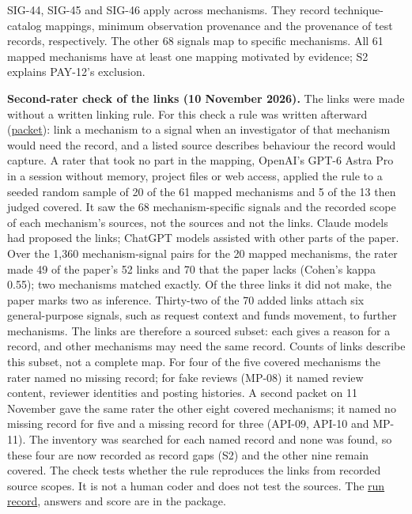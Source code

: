 \documentclass[
  11pt,
]{article}
\begin{document}
\mbox{SIG-44}, \mbox{SIG-45} and \mbox{SIG-46} apply across mechanisms.
They record technique-catalog mappings, minimum observation provenance
and the provenance of test records, respectively. The other 68 signals
map to specific mechanisms. All 61 mapped mechanisms have at least one
mapping motivated by evidence; S2 explains \mbox{PAY-12}'s exclusion.

\textbf{Second-rater check of the links (10 November 2026).} The links
were made without a written linking rule. For this check a rule was
written afterward (\href{tools/second_coder/PACKET.md}{packet}): link a
mechanism to a signal when an investigator of that mechanism would need
the record, and a listed source describes behaviour the record would
capture. A rater that took no part in the mapping, OpenAI's \mbox{GPT-6}
Astra Pro in a session without memory, project files or web access,
applied the rule to a seeded random sample of 20 of the 61 mapped
mechanisms and 5 of the 13 then judged covered. It saw the 68
mechanism-specific signals and the recorded scope of each mechanism's
sources, not the sources and not the links. Claude models had proposed
the links; ChatGPT models assisted with other parts of the paper. Over
the 1,360 mechanism-signal pairs for the 20 mapped mechanisms, the rater
made 49 of the paper's 52 links and 70 that the paper lacks (Cohen's
kappa 0.55); two mechanisms matched exactly. Of the three links it did
not make, the paper marks two as inference. Thirty-two of the 70 added
links attach six general-purpose signals, such as request context and
funds movement, to further mechanisms. The links are therefore a sourced
subset: each gives a reason for a record, and other mechanisms may need
the same record. Counts of links describe this subset, not a complete
map. For four of the five covered mechanisms the rater named no missing
record; for fake reviews (\mbox{MP-08}) it named review content,
reviewer identities and posting histories. A second packet on 11
November gave the same rater the other eight covered mechanisms; it
named no missing record for five and a missing record for three
(\mbox{API-09}, \mbox{API-10} and \mbox{MP-11}). The inventory was
searched for each named record and none was found, so these four are now
recorded as record gaps (S2) and the other nine remain covered. The
check tests whether the rule reproduces the links from recorded source
scopes. It is not a human coder and does not test the sources. The
\href{tools/second_coder/real_run/RUN_RECORD.md}{run record}, answers
and score are in the package.
\end{document}
